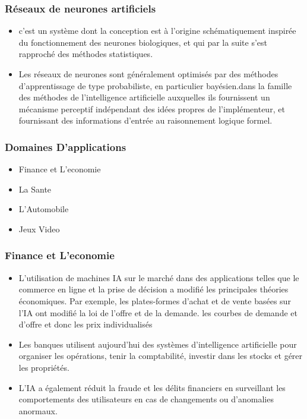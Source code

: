 \documentclass{beamer}
\begin{document}
	
	\begin{frame}
		\frametitle{Réseaux de neurones artificiels}
		\begin{itemize}
		    \item  c'est un système dont la conception est à l'origine schématiquement inspirée du fonctionnement des neurones biologiques, et qui par la suite s'est rapproché des méthodes statistiques.
		    \item Les réseaux de neurones sont généralement optimisés par des méthodes d’apprentissage de type probabiliste, en particulier bayésien.dans la famille des méthodes de l’intelligence artificielle auxquelles ils fournissent un mécanisme perceptif indépendant des idées propres de l'implémenteur, et fournissant des informations d'entrée au raisonnement logique formel.
		\end{itemize}
		
	\end{frame}


	
 	\begin{frame}
 	   \frametitle{Domaines D'applications}
 	   \begin{itemize}
 	    \item Finance et L'economie
 	    \item La Sante
 	    \item L'Automobile
 	    \item Jeux Video
 	   \end{itemize}
 	\end{frame}
 	
 	
 	\begin{frame}
 	   \frametitle{Finance et L'economie}
 	        \begin{itemize}
 	            \item L'utilisation de machines IA sur le marché dans des applications telles que le commerce en ligne et la prise de décision a modifié les principales théories économiques. Par exemple, les plates-formes d'achat et de vente basées sur l'IA ont modifié la loi de l'offre et de la demande. les courbes de demande et d'offre et donc les prix individualisés
 	            
 	            \item Les banques utilisent aujourd'hui des systèmes d'intelligence artificielle pour organiser les opérations, tenir la comptabilité, investir dans les stocks et gérer les propriétés.
 	           
 	            \item L'IA a également réduit la fraude et les délits financiers en surveillant les comportements des utilisateurs en cas de changements ou d'anomalies anormaux.
 	        \end{itemize}
 	\end{frame}
 	
\end{document}
